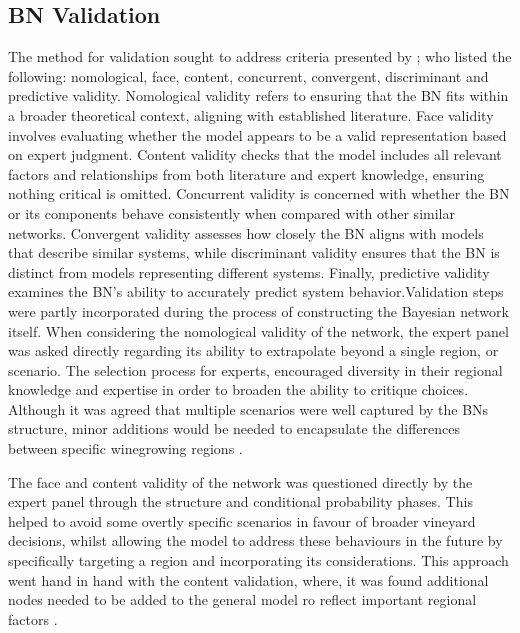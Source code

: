 \subsection{BN Validation}

The method for validation sought to address criteria presented by \textcite{pitchforthProposedValidationFramework2013}; who listed the following:  nomological, face, content, concurrent, convergent, discriminant and predictive validity. Nomological validity refers to ensuring that the BN fits within a broader theoretical context, aligning with established literature. Face validity involves evaluating whether the model appears to be a valid representation based on expert judgment. Content validity checks that the model includes all relevant factors and relationships from both literature and expert knowledge, ensuring nothing critical is omitted. Concurrent validity is concerned with whether the BN or its components behave consistently when compared with other similar networks. Convergent validity assesses how closely the BN aligns with models that describe similar systems, while discriminant validity ensures that the BN is distinct from models representing different systems. Finally, predictive validity examines the BN's ability to accurately predict system behavior.Validation steps were partly incorporated during the process of constructing the Bayesian network itself. When considering the nomological validity of the network, the expert panel was asked directly regarding its ability to extrapolate beyond a single region, or scenario. The selection process for experts, encouraged diversity in their regional knowledge and expertise in order to broaden the ability to critique choices. Although it was agreed that multiple scenarios were well captured by the BNs structure, minor additions would be needed to encapsulate the differences between specific winegrowing regions \citep{abbalDecisionSupportSystem2016,agostaRegionalClimateVariability2012,soarClimateDriversRed2008}.

The face and content validity of the network was questioned directly by the expert panel through the structure and conditional probability phases. This helped to avoid some overtly specific scenarios in favour of broader vineyard decisions, whilst allowing the model to address these behaviours in the future by specifically targeting a region and incorporating its considerations. This approach went hand in hand with the content validation, where, it was found additional nodes needed to be added to the general model ro reflect important regional factors \citep{abbalDecisionSupportSystem2016,ellisUsingBayesianGrowth2020,agostaRegionalClimateVariability2012,barriguinhaVineyardYieldEstimation2021,brockRelationSoilOrganic2011}. 

